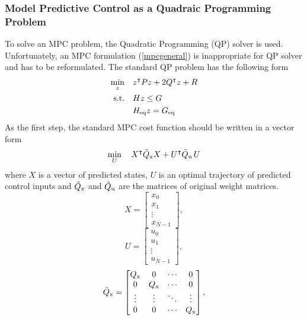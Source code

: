 \subsubsection{Model Predictive Control as a Quadraic Programming Problem}
To solve an MPC problem, the Quadratic Programming (QP) solver is used. Unfortunately, an MPC formulation (\ref{mpcgeneral}) is inappropriate for QP solver and has to be reformulated. The standard QP problem has the following form
\begin{subequations}
	\begin{align}
	\min_{z}\quad & z^\intercal Pz + 2Q^\intercal z + R\\
	\label{cst_qp}\text{s.t.}\quad&Hz\leq G\\
	&H _{\text{eq}}z = G _{\text{eq}}
	\end{align}
\end{subequations}
As the first step, the standard MPC cost function should be written in a vector form
\begin{equation}
	\min_{U}\quad X^\intercal\tilde{Q} _{\text{x}}X + U^\intercal\tilde{Q} _{\text{u}}\,U\\
\end{equation}
where $X$ is a vector of predicted states, $U$ is an optimal trajectory of predicted control inputs and $\tilde{Q} _{\text{x}}$ and $\tilde{Q} _{\text{u}}$ are the matrices of original weight matrices.
\begin{equation}
	X = \begin{bmatrix}
	x_0\\x_{1}\\\vdots\\x_{N-1}
		\end{bmatrix},
\end{equation}
\begin{equation}
U = \begin{bmatrix}
u_0\\u_{1}\\\vdots\\u_{N-1}
\end{bmatrix},
\end{equation}
\begin{equation}
\tilde{Q} _{\text{x}} = \begin{bmatrix}
Q _{\text{x}}&0&\cdots&0\\
0&Q _{\text{x}}&\cdots&0\\
\vdots&\vdots&\ddots&\vdots\\
0&0&\cdots&Q _{\text{x}}
\end{bmatrix},
\end{equation}
